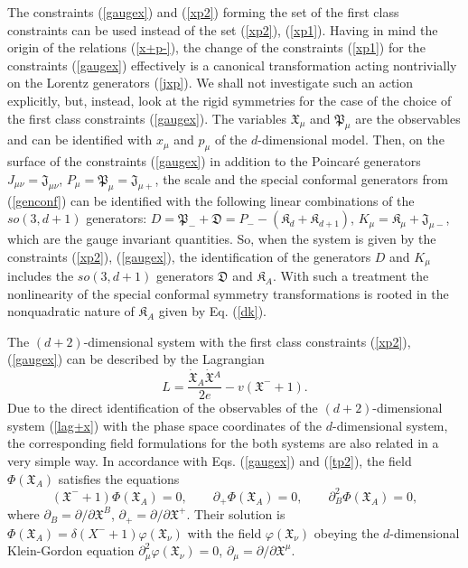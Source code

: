 \documentclass[a4paper,12pt]{article}
\def\X{\mathfrak X}
\def\P{\mathfrak P}
\def\K{\mathfrak K}
\def\J{\mathfrak J}
\def\D{\mathfrak D}
\begin{document}
The constraints (\ref{gaugex}) and (\ref{xp2})
forming  the set of the first class constraints
can be used instead of the set
(\ref{xp2}), (\ref{xp1}).
Having in mind the origin of the relations
(\ref{x+p-}), the change of the constraints
(\ref{xp1}) for
the constraints
(\ref{gaugex}) effectively is a canonical transformation
acting nontrivially on the Lorentz generators (\ref{jxp}).
We shall not investigate such an action explicitly,
but,
instead, look at the rigid symmetries
for the case of the choice of the first class constraints
(\ref{gaugex}).
The variables $\X_\mu$ and $\P_\mu$
are the observables and can be identified with
$x_\mu$ and $p_\mu$ of the $d$-dimensional model.
Then, on the surface of the constraints (\ref{gaugex})
in addition to the Poincar\'e generators
$J_{\mu\nu}=\J_{\mu\nu}$, $P_\mu=\P_\mu=\J_{\mu +}$,
the scale and the special conformal
generators from (\ref{genconf}) can be identified
with the following linear combinations
of the $so(3,d+1)$ generators:
$D=\P_-+\D=P_--(\K_d+\K_{d+1})$,
$K_\mu=\K_\mu+\J_{\mu-}$,
which are the gauge invariant quantities.
So, when the system is given by
the constraints (\ref{xp2}),
(\ref{gaugex}),
the identification of the
generators $D$ and $K_\mu$ includes
the $so(3,d+1)$ generators
$\D$ and $\K_A$.
With such a treatment the nonlinearity of the special
conformal symmetry transformations
is rooted in the nonquadratic nature of $\K_A$
given by Eq. (\ref{dk}).


The $(d+2)$-dimensional system with the
first class constraints
(\ref{xp2}), (\ref{gaugex})
can be described by the  Lagrangian
\begin{equation}
L=\frac{\dot{\X}_A\dot{\X}{}^A}{2e}
-v(\X^-+1).
\label{lag+x}
\end{equation}
Due to the direct identification of the
observables of the $(d+2)$-dimensional
system (\ref{lag+x})
with the phase space coordinates of the
$d$-dimensional system, the corresponding
field formulations for the both systems
are also related in a very simple way.
In accordance with Eqs. (\ref{gaugex})
and (\ref{tp2}),
the field $\Phi(\X_A)$ satisfies
the equations
$$
(\X^-+1)\Phi(\X_A)=0,\qquad
\partial_+\Phi(\X_A)=0,\qquad
\partial_B^2\Phi(\X_A)=0,
$$
where
$\partial_B=\partial/\partial \X^B$,
$\partial_+=\partial/\partial \X^+$.
Their solution is
$\Phi(\X_A)=
\delta(X^-+1)\varphi(\X_\nu)$
with the field
$\varphi(\X_\nu)$
obeying the $d$-dimensional Klein-Gordon
equation $\partial_\mu^2\varphi(\X_\nu)=0$,
$\partial_\mu=\partial/\partial \X^\mu$.
\end{document}
